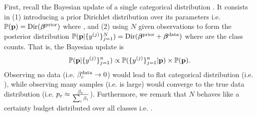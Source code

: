 First, recall the Bayesian update of a single categorical distribution . It consists in (1) introducing a prior Dirichlet distribution over its parameters i.e. $\mathbb{P}(\mathbf{p}) = \text{Dir}(\bm{\beta^\text{prior}})$ where , and (2) using $N$ given observations  to form the posterior distribution $\mathbb{P}(\mathbf{p}|\{y^{(j)}\}_{j =1}^N)= \text{Dir}(\bm{\beta^\text{prior}} + \bm{\beta^\text{data}})$ where  are the class counts. That is, the Bayesian update is
\begin{equation}
    \begin{aligned}
    \mathbb{P}(\mathbf{p}|\{y^{(j)}\}_{j =1}^n) \propto \mathbb{P}(\{y^{(j)}\}_{j =1}^n|\mathbf{p}) \times \mathbb{P}(\mathbf{p}).
    \end{aligned}
\end{equation}
Observing no data (i.e. $\beta_c^\text{data} \rightarrow 0$) would lead to flat categorical distribution (i.e. ), while observing many samples (i.e.  is large) would converge to the true data distribution (i.e. $p_c \approx \frac{\beta_c}{\sum_i\beta_i}$).
Furthermore, we remark that $N$ behaves like a certainty budget distributed over all classes i.e. .

